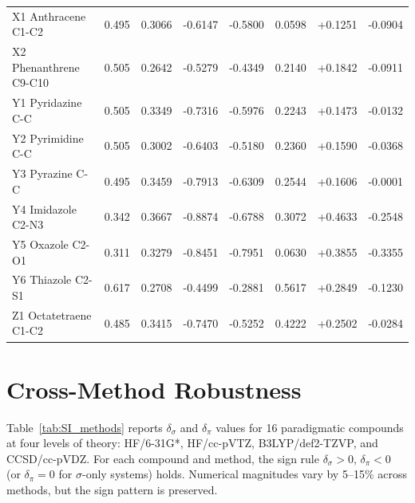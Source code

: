 \documentclass[11pt,a4paper]{article}
\begin{document}
\begin{longtable}{p{4.5cm}rrrrrrr}
X1 Anthracene C1-C2 & 0.495 & 0.3066 & -0.6147 & -0.5800 & 0.0598 & +0.1251 & -0.0904\\
X2 Phenanthrene C9-C10 & 0.505 & 0.2642 & -0.5279 & -0.4349 & 0.2140 & +0.1842 & -0.0911\\
Y1 Pyridazine C-C & 0.505 & 0.3349 & -0.7316 & -0.5976 & 0.2243 & +0.1473 & -0.0132\\
Y2 Pyrimidine C-C & 0.505 & 0.3002 & -0.6403 & -0.5180 & 0.2360 & +0.1590 & -0.0368\\
Y3 Pyrazine C-C & 0.495 & 0.3459 & -0.7913 & -0.6309 & 0.2544 & +0.1606 & -0.0001\\
Y4 Imidazole C2-N3 & 0.342 & 0.3667 & -0.8874 & -0.6788 & 0.3072 & +0.4633 & -0.2548\\
Y5 Oxazole C2-O1 & 0.311 & 0.3279 & -0.8451 & -0.7951 & 0.0630 & +0.3855 & -0.3355\\
Y6 Thiazole C2-S1 & 0.617 & 0.2708 & -0.4499 & -0.2881 & 0.5617 & +0.2849 & -0.1230\\
Z1 Octatetraene C1-C2 & 0.485 & 0.3415 & -0.7470 & -0.5252 & 0.4222 & +0.2502 & -0.0284\\
\end{longtable}

\section{Cross-Method Robustness}
\label{sec:SI_methods}

Table~\ref{tab:SI_methods} reports $\delta_\sigma$ and $\delta_\pi$ values
for 16 paradigmatic compounds at four levels of theory:
HF/6-31G*, HF/cc-pVTZ, B3LYP/def2-TZVP, and CCSD/cc-pVDZ. For each
compound and method, the sign rule $\delta_\sigma > 0$, $\delta_\pi < 0$
(or $\delta_\pi = 0$ for $\sigma$-only systems) holds. Numerical
magnitudes vary by 5--15\% across methods, but the sign pattern is
preserved.
\end{document}
